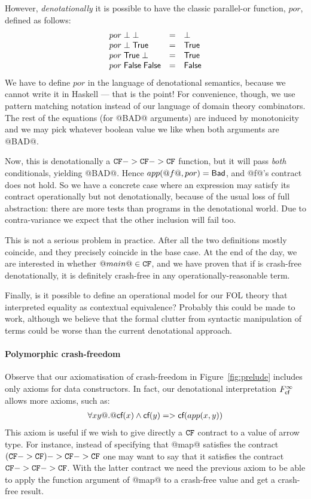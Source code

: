 However, \emph{denotationally} it is possible to have the classic
parallel-or function, $por$, defined as
follows:
\[\begin{array}{lcl}
  por\;\bot\;\bot & = & \bot \\
  por\;\bot\;\mathsf{True} & = & \mathsf{True} \\
  por\;\mathsf{True}\;\bot & = & \mathsf{True} \\
  por\;\mathsf{False}\;\mathsf{False} & = & \mathsf{False}
\end{array}\]
We have to define $por$ in the language of denotational semantics, because
we cannot write it in Haskell --- that is the point!  For convenience,
though, we use pattern matching notation instead of our
language of domain theory combinators.
The rest of the equations (for @BAD@ arguments) are induced by
monotonicity and we may pick whatever boolean value we like when both
arguments are @BAD@.

Now, this is denotationally a ${\tt CF} -> {\tt CF} -> {\tt CF}$ function, but it
will pass \emph{both} conditionals,
yielding @BAD@. Hence $app(@f@,por) = \mathsf{Bad}$, and @f@'s contract does not hold.
So we have a concrete case where an expression may satisfy its
contract operationally but not denotationally, because of the usual
loss of full abstraction: there are more tests than programs in the denotational world.
Due to contra-variance
we expect that the other inclusion will fail too.

This is not a serious problem in practice.
After all the two definitions mostly coincide, and
they precisely coincide in the base case.  At the end of the day, we
are interested in whether $@main@ \in {\tt CF}$, and we have proven that if
is crash-free denotationally, it is definitely crash-free in any
operationally-reasonable term.

Finally, is it possible to define an operational model for our FOL theory that interpreted
equality as contextual equivalence? Probably this could be made to work, although we believe
that the formal clutter from syntactic manipulation of terms could be worse than the current
denotational approach.


\paragraph{Polymorphic crash-freedom}

Observe that our axiomatisation of crash-freedom in Figure~\ref{fig:prelude}
includes only axioms for data constructors. In fact, our denotational interpretation
$F_{\textsf{cf}}^{\infty}$ allows more axioms, such as:
\[\begin{array}{l}
    \forall x y @.@ \textsf{cf}(x) \land \textsf{cf}(y) => \textsf{cf}(app(x,y))
\end{array}\]
This axiom is useful if we wish to give directly a ${\tt CF}$ contract to a value of
arrow type. For instance, instead of specifying that @map@ satisfies the contract
$({\tt CF} -> {\tt CF}) -> {\tt CF} -> {\tt CF}$ one may want to say that it satisfies the contract
${\tt CF} -> {\tt CF} -> {\tt CF}$. With the latter contract we need the previous axiom to be
able to apply the function argument of @map@ to a crash-free value and get a
crash-free result.

